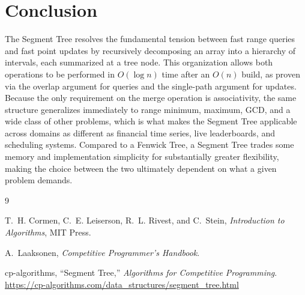 \documentclass[11pt]{article}
\begin{document}
\section{Conclusion}

The Segment Tree resolves the fundamental tension between fast range queries and fast point updates by recursively decomposing an array into a hierarchy of intervals, each summarized at a tree node. This organization allows both operations to be performed in $O(\log n)$ time after an $O(n)$ build, as proven via the overlap argument for queries and the single-path argument for updates. Because the only requirement on the merge operation is associativity, the same structure generalizes immediately to range minimum, maximum, GCD, and a wide class of other problems, which is what makes the Segment Tree applicable across domains as different as financial time series, live leaderboards, and scheduling systems. Compared to a Fenwick Tree, a Segment Tree trades some memory and implementation simplicity for substantially greater flexibility, making the choice between the two ultimately dependent on what a given problem demands.

\begin{thebibliography}{9}

T.~H. Cormen, C.~E. Leiserson, R.~L. Rivest, and C.~Stein, \textit{Introduction to Algorithms}, MIT Press.

A.~Laaksonen, \textit{Competitive Programmer's Handbook}.

cp-algorithms, ``Segment Tree,'' \textit{Algorithms for Competitive Programming}. \url{https://cp-algorithms.com/data_structures/segment_tree.html}

\end{thebibliography}
\end{document}
